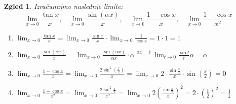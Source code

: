\documentclass[10pt, a4paper]{article}
\newtheorem{zgled}{Zgled}[section]
\newcommand{\limf}[3]{\lim_{#1 \to #2} {#3}}
\begin{document}
\begin{zgled}
    Izračunajmo naslednje limite:
    $$\limf{x}{0}{\frac{\tan x}{x}}, \quad \limf{x}{0}{\frac{\sin (\alpha x)}{x}}, \quad \limf{x}{0}{\frac{1 - \cos x}{x}}, \quad \limf{x}{0}{\frac{1 - \cos x}{x^2}}$$

    \begin{enumerate}
        \item $\displaystyle \limf{x}{0}{\frac{\tan x}{x}}  = \limf{x}{0}{\frac{\sin x}{x}} \cdot \limf{x}{0}{\frac{1}{\cos x}} = 1 \cdot 1 = 1$
        \item $\displaystyle \limf{x}{0}{\frac{\sin (\alpha x)}{x}} = \limf{x}{0}{\frac{\sin (\alpha x)}{\alpha x} \cdot \alpha} 
        \stackrel{\alpha x = t}{=} \limf{t}{0}{\frac{\sin t}{t} \alpha}
        = \alpha$
        \item $\displaystyle \limf{x}{0}{\frac{1 - \cos x}{x}} = \limf{x}{0}{\frac{2 \sin^2 \left( \frac{x}{2} \right)}{x}}
        = \limf{x}{0}{2 \cdot \frac{\sin \frac{x}{2}}{x} \cdot \sin \left(\frac{x}{2}\right)}
        = 0$
        \item $\displaystyle \limf{x}{0}{\frac{1 - \cos x}{x^2}} = \limf{x}{0}{\frac{2 \sin^2 \frac{x}{2}}{x^2}}
        = \limf{x}{0}{2\left( \frac{\sin \frac{x}{2}}{x} \right)^2}
        = 2 \cdot \left(\frac{1}{2}\right)^2 = \frac{1}{2}$
    \end{enumerate}
\end{zgled}

\end{document}
